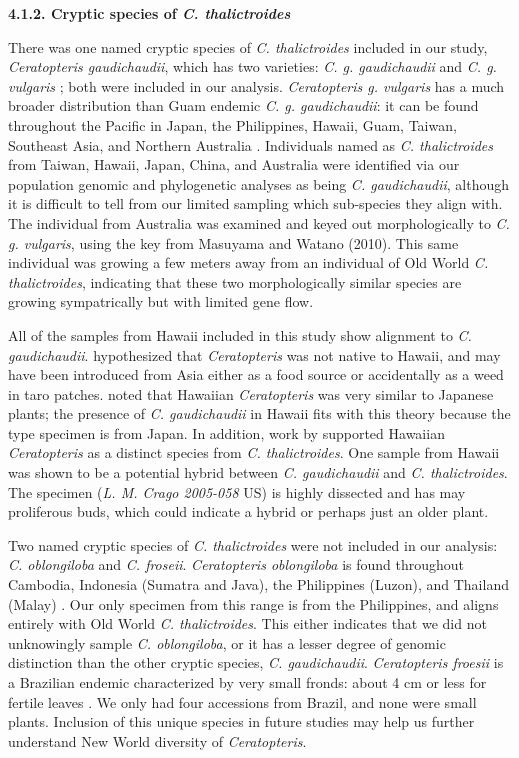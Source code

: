\documentclass[12pt]{article}
\begin{document}
\begin{flushleft}
\textbf{4.1.2. Cryptic species of \textit{C. thalictroides}}

There was one named cryptic species of \textit{C. thalictroides} included in our study, \textit{Ceratopteris gaudichaudii}, which has two varieties: \textit{C. g. gaudichaudii} and \textit{C. g. vulgaris} \autocite{Masuyama2010}; both were included in our analysis. \textit{Ceratopteris g. vulgaris} has a much broader distribution than Guam endemic \textit{C. g. gaudichaudii}: it can be found throughout the Pacific in Japan, the Philippines, Hawaii, Guam, Taiwan, Southeast Asia, and Northern Australia \autocite{Masuyama2010}. Individuals named as \textit{C. thalictroides} from Taiwan, Hawaii, Japan, China, and Australia were identified via our population genomic and phylogenetic analyses as being \textit{C. gaudichaudii}, although it is difficult to tell from our limited sampling which sub-species they align with. The individual from Australia was examined and keyed out morphologically to \textit{C. g. vulgaris}, using the key from Masuyama and Watano (2010). This same individual was growing a few meters away from an individual of Old World \textit{C. thalictroides}, indicating that these two morphologically similar species are growing sympatrically but with limited gene flow. 

All of the samples from Hawaii included in this study show alignment to \textit{C. gaudichaudii}. \textcite{Wagner1950} hypothesized that \textit{Ceratopteris} was not native to Hawaii, and may have been introduced from Asia either as a food source or accidentally as a weed in taro patches. \textcite{Lloyd1973} noted that Hawaiian \textit{Ceratopteris} was very similar to Japanese plants; the presence of \textit{C. gaudichaudii} in Hawaii fits with this theory because the type specimen is from Japan. In addition, work by \textcite{Hickok1979} supported Hawaiian \textit{Ceratopteris} as a distinct species from \textit{C. thalictroides}. One sample from Hawaii was shown to be a potential hybrid between \textit{C. gaudichaudii} and \textit{C. thalictroides}. The specimen (\textit{L. M. Crago 2005-058} US) is highly dissected and has may proliferous buds, which could indicate a hybrid or perhaps just an older plant.

Two named cryptic species of \textit{C. thalictroides} were not included in our analysis: \textit{C. oblongiloba} and \textit{C. froseii}. \textit{Ceratopteris oblongiloba} is found throughout Cambodia, Indonesia (Sumatra and Java), the Philippines (Luzon), and Thailand (Malay) \autocite{Masuyama2010}. Our only specimen from this range is from the Philippines, and aligns entirely with Old World \textit{C. thalictroides}. This either indicates that we did not unknowingly sample \textit{C. oblongiloba}, or it has a lesser degree of genomic distinction than the other cryptic species, \textit{C. gaudichaudii}. \textit{Ceratopteris froesii} is a Brazilian endemic characterized by very small fronds: about 4 cm or less for fertile leaves \autocite{Masuyama2010}. We only had four accessions from Brazil, and none were small plants. Inclusion of this unique species in future studies may help us further understand New World diversity of \textit{Ceratopteris}.


\end{flushleft}
\end{document}
